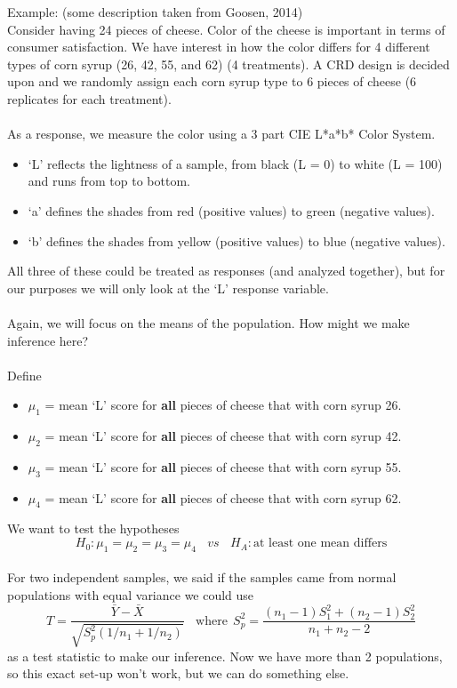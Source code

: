 Example:  (some description taken from Goosen, 2014)\\
Consider having 24 pieces of cheese.  Color of the cheese is important in terms of consumer satisfaction.  We have interest in how the color differs for 4 different types of corn syrup (26, 42, 55, and 62) (4 treatments).  A CRD design is decided upon and we randomly assign each corn syrup type to 6 pieces of cheese (6 replicates for each treatment).\\~\\
As a response, we measure the color using a 3 part CIE L*a*b* Color System.
\begin{itemize}
\item `L' reflects the lightness of a sample, from black (L = 0) to white (L = 100) and runs from top to bottom.
\item `a' defines the shades from red (positive values) to green (negative values). 
\item `b' defines the shades from yellow (positive values) to blue (negative values).
\end{itemize}
All three of these could be treated as responses (and analyzed together), but for our purposes we will only look at the `L' response variable.\\~\\
Again, we will focus on the means of the population.  How might we make inference here?\\~\\
Define
\begin{itemize}
\item $\mu_1$ = mean `L' score for \textbf{all} pieces of cheese that with corn syrup 26.
\item $\mu_2$ = mean `L' score for \textbf{all} pieces of cheese that with corn syrup 42.
\item $\mu_3$ = mean `L' score for \textbf{all} pieces of cheese that with corn syrup 55.
\item $\mu_4$ = mean `L' score for \textbf{all} pieces of cheese that with corn syrup 62.
\end{itemize}

We want to test the hypotheses
$$H_0: \mu_1=\mu_2=\mu_3=\mu_4~~~~vs~~~~H_A:\mbox{at least one mean differs}$$~\\

For two independent samples, we said if the samples came from normal populations with equal variance we could use 
$$T=\frac{\bar{Y}-\bar{X}}{\sqrt{S_p^2(1/n_1+1/n_2)}}~~~~\mbox{where}~~S_p^2 = \frac{(n_1-1)S_1^2+(n_2-1)S_2^2}{n_1+n_2-2}$$
as a test statistic to make our inference.  Now we have more than 2 populations, so this exact set-up won't work, but we can do something else.

